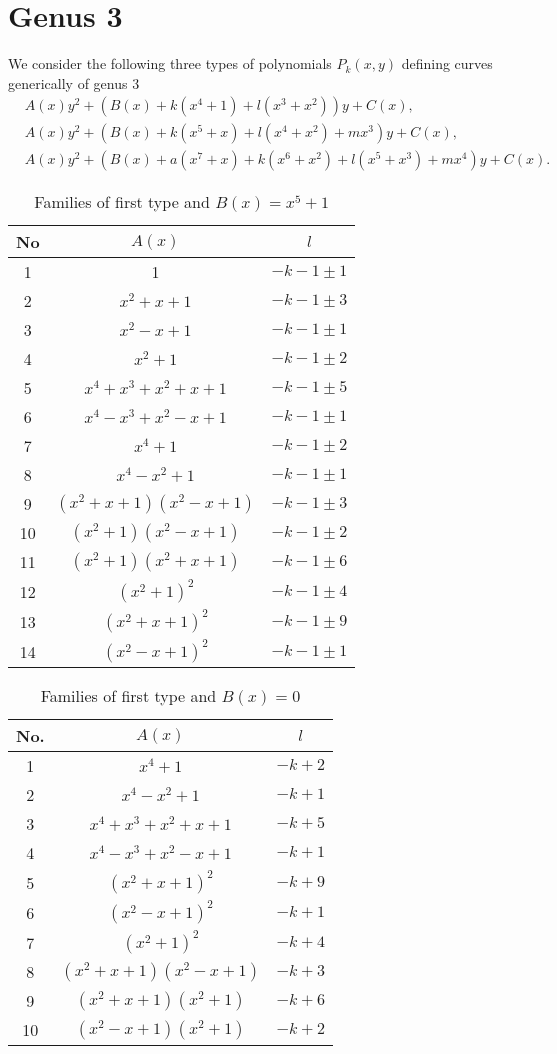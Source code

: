 \documentclass{amsart}
\begin{document}
\section{Genus 3}
We consider the following three types of polynomials $P_k(x,y)$ defining curves generically of genus 3
\begin{align*}
&A(x)y^2+(B(x)+k(x^4+1)+l(x^3+x^2))y+C(x),\\
&A(x)y^2+(B(x)+k(x^5+x)+l(x^4+x^2)+mx^3)y+C(x),\\
&A(x)y^2+(B(x)+a(x^7+x)+k(x^6+x^2)+l(x^5+x^3)+mx^4)y+C(x).
\end{align*}
\begin{table}[ht]
\caption{Families of first type and $B(x)=x^5+1$}
\centering
\begin{tabular}{|c |c |c |}
\hline
No & $A(x)$  & $l$ \\
\hline
1 & 1 & $-k-1\pm 1$ \\
2 & $x^2+x+1$  &  $-k-1\pm 3$      \\
3 & $x^2-x+1$  &  $-k-1\pm 1$      \\
4 & $x^2+1$   & $-k-1\pm 2$       \\
5 & $x^4+x^3+x^2+x+1$  & $-k-1 \pm 5$       \\
6 & $x^4-x^3+x^2-x+1$  & $-k-1 \pm 1$       \\
7 & $x^4+1$  &  $-k-1 \pm 2$      \\
8 & $x^4-x^2+1$ & $-k-1 \pm 1$       \\
9 & $(x^2+x+1)(x^2-x+1)$ & $-k-1\pm 3$       \\
10 & $(x^2+1)(x^2-x+1)$  &    $-k-1\pm 2$    \\
11 & $(x^2+1)(x^2+x+1)$  &     $-k-1 \pm 6$   \\
12 & $(x^2+1)^2$  &  $-k-1 \pm 4$      \\
13 & $(x^2+x+1)^2$  &    $-k-1 \pm 9$    \\
14 & $(x^2-x+1)^2$  &  $-k-1 \pm 1$      \\
\hline
\end{tabular}
\end{table}


\begin{table}[ht]
\caption{Families of first type and $B(x)=0$}
\centering
\begin{tabular}{|c |c |c |}
\hline
No. & $A(x)$ & $l$ \\
\hline
1 & $x^4+1$  & $-k+2$ \\
2 & $x^4-x^2+1$  & $-k+1$ \\
3 & $x^4+x^3+x^2+x+1$  & $-k+5$ \\
4 & $x^4-x^3+x^2-x+1$  & $-k+1$ \\
5 & $(x^2+x+1)^2$ &  $-k+9$ \\
6 & $(x^2-x+1)^2$  & $-k+1$ \\
7 & $(x^2+1)^2$  & $-k+4$ \\
8 & $(x^2+x+1)(x^2-x+1)$  & $-k+3$ \\
9 & $(x^2+x+1)(x^2+1)$  & $-k+6$ \\
10 & $(x^2-x+1)(x^2+1)$  & $-k+2$ \\
\hline
\end{tabular}
\end{table}
\end{document}
